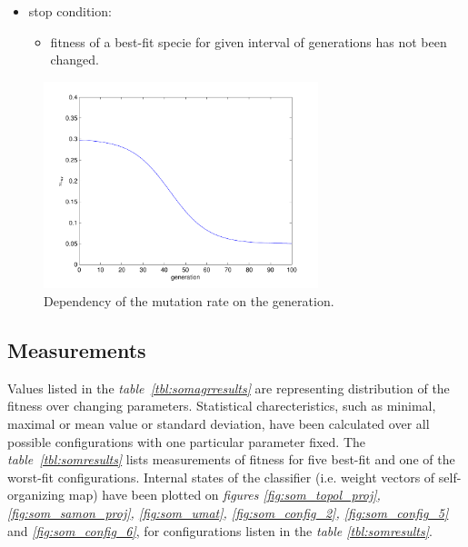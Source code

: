 \documentclass[a4paper]{IEEEtran}
\begin{document}
\begin{itemize}
	\item stop condition:
	\begin{itemize}
		\item fitness of a best-fit specie for given interval of generations has not been changed.
	\end{itemize}	
\end{itemize}
\begin{figure}[!h]
	\centering
	\includegraphics[width=80mm]{mut_r}
	\caption{Dependency of the mutation rate on the generation.}
	\label{fig:mut_r}
\end{figure}

\subsection{Measurements}
Values listed in the \textit{table~\ref{tbl:somagrresults}} are representing distribution of the fitness
over changing parameters.
Statistical charecteristics, such as minimal, maximal or mean value or standard deviation, have been calculated
over all possible configurations with one particular parameter fixed.
The \textit{table~\ref{tbl:somresults}} lists measurements of fitness for five best-fit 
and one of the worst-fit configurations.
Internal states of the classifier (i.e. weight vectors of self-organizing map)
have been plotted on \textit{figures \ref{fig:som_topol_proj}, \ref{fig:som_samon_proj}, \ref{fig:som_umat}, 
\ref{fig:som_config_2}, \ref{fig:som_config_5}} and \textit{\ref{fig:som_config_6}}, for configurations listen in 
the \textit{table \ref{tbl:somresults}}.
\end{document}
